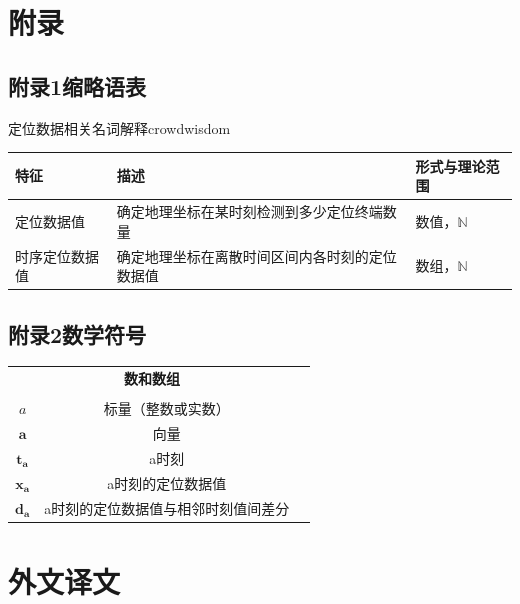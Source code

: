 \documentclass[a4paper,AutoFakeBold,oneside,12pt]{book}
\begin{document}
\chapter*{附\qquad{}录}

{}
\section*{附录1\quad{}缩略语表}

\begin{bupttable}{定位数据相关名词解释}{crowdwisdom}
    \begin{tabular}{l|l|l}
		\hline \textbf{特征} & \textbf{描述} & \textbf{形式与理论范围}\\
		\hline 定位数据值 & 确定地理坐标在某时刻检测到多少定位终端数量 & 数值，$\mathbb{N}$ \\
		\hline 时序定位数据值 & 确定地理坐标在离散时间区间内各时刻的定位数据值 & 数组，$\mathbb{N}$ \\
		\hline
    \end{tabular}
\end{bupttable}


{}
\section*{附录2\quad{}数学符号}
\begin{center}
	\begin{tabular}{ccc}
		\multicolumn{2}{c}{\textbf{数和数组}} \\
		\\
		$a$ & 标量（整数或实数）\\
		$\bm{a}$ & 向量\\
		$\bm{t_a}$ & a时刻\\
		$\bm{x_a}$ & a时刻的定位数据值\\
		$\bm{d_a}$ & a时刻的定位数据值与相邻时刻值间差分\\


	\end{tabular}
\end{center}

\newpage\backmatter
\chapter*{外\quad{}文\quad{}译\quad{}文}
\vspace{8mm}
\end{document}
